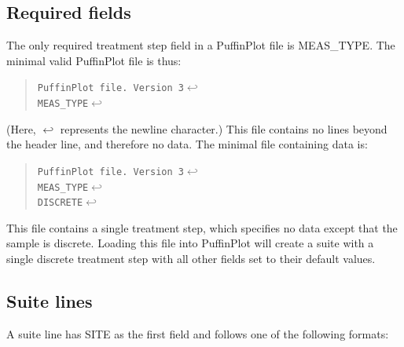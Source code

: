 \documentclass[a4paper,british]{article}
\newcommand{\ppcmd}[1]{\textsf{#1}} %
\begin{document}
\subsection{Required fields}

The only required treatment step field in a PuffinPlot file is \ppcmd{MEAS\_TYPE}.
The minimal valid PuffinPlot file is thus:

\begin{quotation}
\noindent
\verb|PuffinPlot file. Version 3|$\hookleftarrow$\\
\verb|MEAS_TYPE|$\hookleftarrow$
\end{quotation}

\noindent (Here, $\hookleftarrow$ represents the newline character.) This
file contains no lines beyond the header line, and therefore no data. The
minimal file containing data is:

\begin{quotation}
\noindent
\verb|PuffinPlot file. Version 3|$\hookleftarrow$\\
\verb|MEAS_TYPE|$\hookleftarrow$\\
\verb|DISCRETE|$\hookleftarrow$
\end{quotation}

\noindent This file contains a single treatment step, which specifies no
data except that the sample is discrete. Loading this file into PuffinPlot
will create a suite with a single discrete treatment step with all other
fields set to their default values.

\subsection{Suite lines}

A suite line has \ppcmd{SITE} as the first field and follows one of the following formats:
\end{document}
